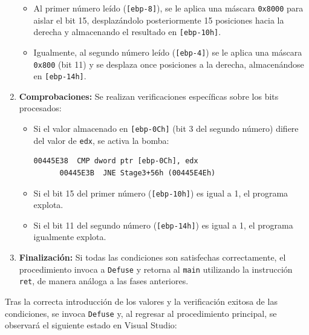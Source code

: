 \documentclass[11pt,a4paper]{article}
\begin{document}
\begin{enumerate}
\begin{itemize}
    \item Al primer número leído (\texttt{[ebp-8]}), se le aplica una máscara \texttt{0x8000} para aislar el bit 15, desplazándolo posteriormente 15 posiciones hacia la derecha y almacenando el resultado en \texttt{[ebp-10h]}.

    \item Igualmente, al segundo número leído (\texttt{[ebp-4]}) se le aplica una máscara \texttt{0x800} (bit 11) y se desplaza once posiciones a la derecha, almacenándose en \texttt{[ebp-14h]}.
  \end{itemize}
  \vspace{1ex}

  \item \textbf{Comprobaciones:} Se realizan verificaciones específicas sobre los bits procesados:
  \begin{itemize}
    \item Si el valor almacenado en \texttt{[ebp-0Ch]} (bit 3 del segundo número) difiere del valor de \texttt{edx}, se activa la bomba: \vspace{1ex}
    \begin{lstlisting}[style=assemblyStyle]
      00445E38  CMP dword ptr [ebp-0Ch], edx
      00445E3B  JNE Stage3+56h (00445E4Eh)
    \end{lstlisting}
    \vspace{1ex}
    \item Si el bit 15 del primer número (\texttt{[ebp-10h]}) es igual a 1, el programa explota. \vspace{1ex}
    \item Si el bit 11 del segundo número (\texttt{[ebp-14h]}) es igual a 1, el programa igualmente explota. \vspace{1ex}
  \end{itemize}

  \item \textbf{Finalización:} Si todas las condiciones son satisfechas correctamente, el procedimiento invoca a \texttt{Defuse} y retorna al \texttt{main} utilizando la instrucción \texttt{ret}, de manera análoga a las fases anteriores.
\end{enumerate}
\vspace{1ex}

\noindent Tras la correcta introducción de los valores y la verificación exitosa de las condiciones, se invoca \texttt{Defuse} y, al regresar al procedimiento principal, se observará el siguiente estado en Visual Studio:
\end{document}
